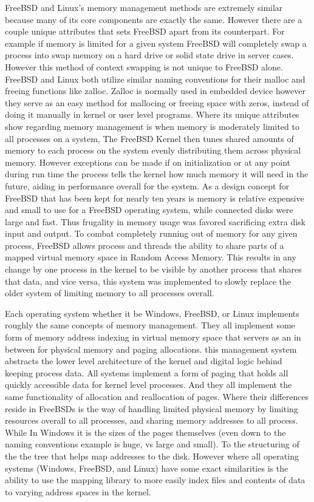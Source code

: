 \documentclass[letterpaper,10pt,titlepage]{IEEEtran}
\begin{document}
FreeBSD and Linux's memory management methods are extremely similar because many of its core components are exactly the same. However there are a couple unique attributes that sets FreeBSD apart from its counterpart. For example if memory is limited for a given system FreeBSD will completely swap a process into swap memory on a hard drive or solid state drive in server cases. However this method of context swapping is not unique to FreeBSD alone. FreeBSD and Linux both utilize similar naming conventions for their malloc and freeing functions like zalloc. Zalloc is normally used in embedded device however they serve as an easy method for mallocing or freeing space with zeros, instead of doing it manually in kernel or user level programs\cite{freeBsdBook}. Where its unique attributes show regarding memory management is when memory is moderately limited to all processes on a system, The FreeBSD Kernel then tunes shared amounts of memory to each process on the system evenly distributing them across physical memory\cite{25Memory88:online}. However exceptions can be made if on initialization or at any point during run time the process tells the kernel how much memory it will need in the future, aiding in performance overall for the system. As a design concept for FreeBSD that has been kept for nearly ten years is memory is relative expensive and small to use for a FreeBSD operating system, while connected disks were large and fast. Thus frugality in memory usage was favored sacrificing extra disk input and output\cite{freeBsdBook}. To combat completely running out of memory for any given process, FreeBSD allows process and threads the ability to share parts of a mapped virtual memory space in Random Access Memory. This results in any change by one process in the kernel to be visible by another process that shares that data, and vice versa, this system was implemented to slowly replace the older system of limiting memory to all processes overall.

Each operating system whether it be Windows, FreeBSD, or Linux implements roughly the same concepts of memory management. They all implement some form of memory address indexing in virtual memory space that servers as an in between for physical memory and paging allocations. this management system abstracts the lower level architecture of the kernel and digital logic behind keeping process data. All systems implement a form of paging that holds all quickly accessible data for kernel level processes. And they all implement the same functionality of allocation and reallocation of pages. Where their differences reside in FreeBSDs is the way of handling limited physical memory by limiting resources overall to all processes, and sharing memory addresses to all process. While In Windows it is the sizes of the pages themselves (even down to the naming conventions example is huge, vs large and small). To the structuring of the the tree that helps map addresses to the disk. However where all operating systems (Windows, FreeBSD, and Linux) have some exact similarities is the ability to use the mapping library to more easily index files and contents of data to varying address spaces in the kernel.


\nocite{*}%


\end{document}
